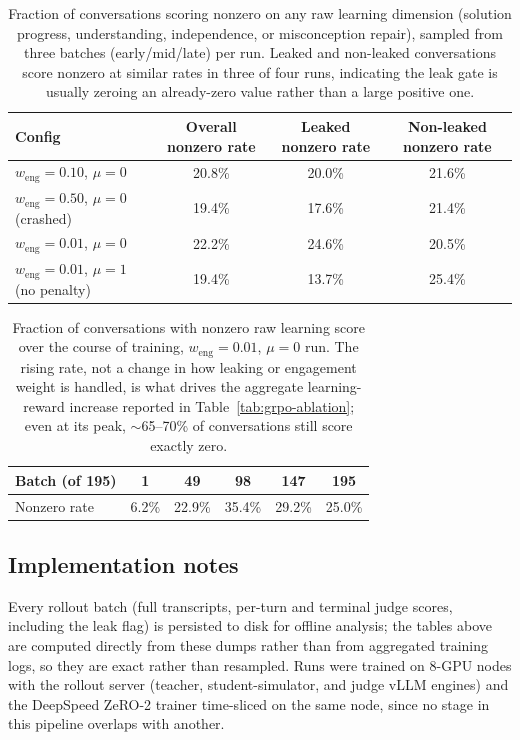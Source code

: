 \documentclass[11pt]{article}
\begin{document}
\begin{table}[h]
\centering
\small
\begin{tabular}{lccc}
\toprule
Config & Overall nonzero rate & Leaked nonzero rate & Non-leaked nonzero rate \\
\midrule
$w_{\text{eng}}{=}0.10$, $\mu{=}0$ & 20.8\% & 20.0\% & 21.6\% \\
$w_{\text{eng}}{=}0.50$, $\mu{=}0$ (crashed) & 19.4\% & 17.6\% & 21.4\% \\
$w_{\text{eng}}{=}0.01$, $\mu{=}0$ & 22.2\% & 24.6\% & 20.5\% \\
$w_{\text{eng}}{=}0.01$, $\mu{=}1$ (no penalty) & 19.4\% & 13.7\% & 25.4\% \\
\bottomrule
\end{tabular}
\caption{Fraction of conversations scoring nonzero on any raw learning
dimension (solution progress, understanding, independence, or misconception
repair), sampled from three batches (early/mid/late) per run. Leaked and
non-leaked conversations score nonzero at similar rates in three of four
runs, indicating the leak gate is usually zeroing an already-zero value
rather than a large positive one.}
\label{tab:sparsity-leak}
\end{table}

\begin{table}[h]
\centering
\small
\begin{tabular}{lccccc}
\toprule
Batch (of 195) & 1 & 49 & 98 & 147 & 195 \\
\midrule
Nonzero rate & 6.2\% & 22.9\% & 35.4\% & 29.2\% & 25.0\% \\
\bottomrule
\end{tabular}
\caption{Fraction of conversations with nonzero raw learning score over the
course of training, $w_{\text{eng}}{=}0.01$, $\mu{=}0$ run. The rising rate,
not a change in how leaking or engagement weight is handled, is what drives
the aggregate learning-reward increase reported in
Table~\ref{tab:grpo-ablation}; even at its peak, $\sim$65--70\% of
conversations still score exactly zero.}
\label{tab:sparsity-time}
\end{table}

\subsection{Implementation notes}
Every rollout batch (full transcripts, per-turn and terminal judge scores,
including the leak flag) is persisted to disk for offline analysis; the
tables above are computed directly from these dumps rather than from
aggregated training logs, so they are exact rather than resampled. Runs were
trained on 8-GPU nodes with the rollout server (teacher, student-simulator,
and judge vLLM engines) and the DeepSpeed ZeRO-2 trainer time-sliced on the
same node, since no stage in this pipeline overlaps with another.
\end{document}
